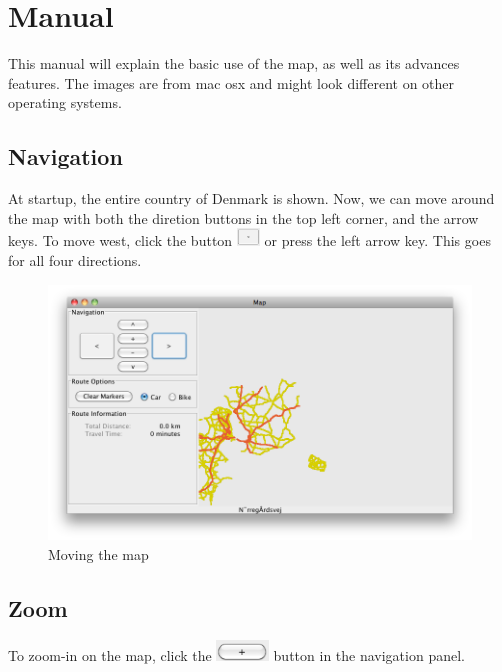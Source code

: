 \chapter{Manual}
\label{MAN}

This manual will explain the basic use of the map, as well as its
advances features. The images are from mac osx and might look different on other
operating systems.

\section{Navigation}
\label{MAN-N}
At startup, the entire country of Denmark is shown. Now, we can move around the
map with both the diretion buttons in the top left corner, and the arrow keys.
To move west, click the button
\includegraphics[height=1.3em]{images/westbutton.png} or press the left arrow
key. This goes for all four directions.

\begin{figure}[h!]
\centering
\includegraphics[width=1\linewidth]{images/man-move.png}
\caption{Moving the map}
\label{MAN-Z-COP}
\end{figure}

\section{Zoom}
\label{MAN-Z}
To zoom-in on the map, click the
\includegraphics[height=1.5em]{images/zoominbutton.png} button in the navigation
panel.

